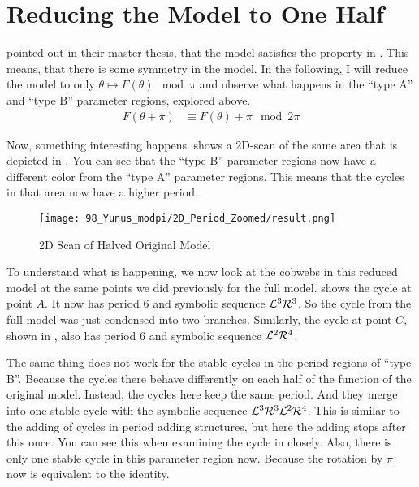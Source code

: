 \section{Reducing the Model to One Half}
\label{sec:og.halved}

 pointed out in their master thesis, that the model satisfies the property in .
This means, that there is some symmetry in the model.
In the following, I will reduce the model to only $\theta \mapsto F(\theta) \mod \pi$ and observe what happens in the ``type A'' and ``type B'' parameter regions, explored above.
\begin{align}
    F(\theta + \pi) & \equiv F(\theta) + \pi \mod 2 \pi \label{equ:yunus.property.symmetry}
\end{align}

Now, something interesting happens.
 shows a 2D-scan of the same area that is depicted in .
You can see that the ``type B'' parameter regions now have a different color from the ``type A'' parameter regions.
This means that the cycles in that area now have a higher period.

\begin{figure}
    \centering
    \texttt{[image: 98\_Yunus\_modpi/2D\_Period\_Zoomed/result.png]}
    \caption{2D Scan of Halved Original Model}
    \label{fig:yunus.pi.2d.full}
\end{figure}

To understand what is happening, we now look at the cobwebs in this reduced model at the same points we did previously for the full model.
 shows the cycle at point $A$.
It now has period 6 and symbolic sequence $\mathcal{L}^3\mathcal{R}^3$.
So the cycle from the full model was just condensed into two branches.
Similarly, the cycle at point $C$, shown in , also has period 6 and symbolic sequence $\mathcal{L}^2\mathcal{R}^4$.

The same thing does not work for the stable cycles in the period regions of ``type B''.
Because the cycles there behave differently on each half of the function of the original model.
Instead, the cycles here keep the same period.
And they merge into one stable cycle with the symbolic sequence $\mathcal{L}^3\mathcal{R}^3\mathcal{L}^2\mathcal{R}^4$.
This is similar to the adding of cycles in period adding structures, but here the adding stops after this once.
You can see this when examining the cycle in  closely.
Also, there is only one stable cycle in this parameter region now.
Because the rotation by $\pi$ now is equivalent to the identity.

